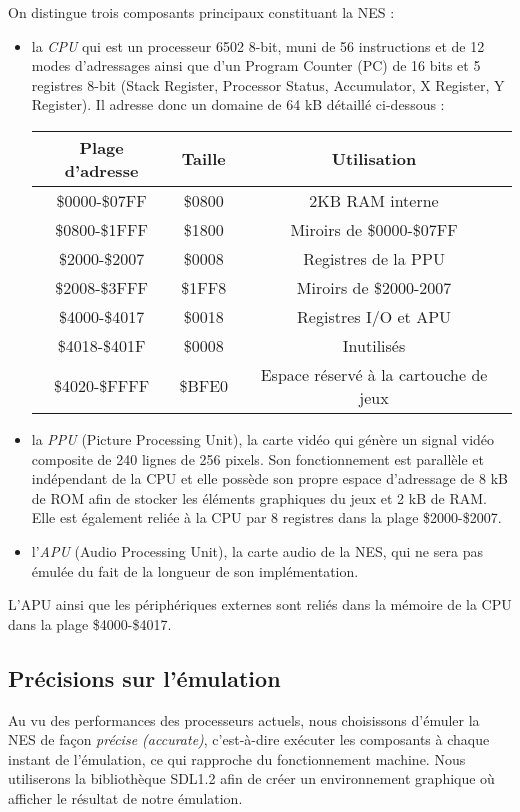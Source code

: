 On distingue trois composants principaux constituant la NES :
\begin{itemize}
\item la \emph{CPU} qui est un processeur 6502 8-bit, muni de 56 instructions et de 12 modes d'adressages ainsi que d'un Program Counter (PC) de 16 bits et 5 registres 8-bit (Stack Register, Processor Status, Accumulator, X Register, Y Register). Il adresse donc un domaine de 64 kB détaillé ci-dessous :

\begin{center}
\begin{tabular}{|c|c|c|}
  \hline
  Plage d'adresse & Taille & Utilisation \\
  \hline
  \$0000-\$07FF & \$0800 & 2KB RAM interne\\
  \hline
  \$0800-\$1FFF & \$1800 & Miroirs de \$0000-\$07FF \\
  \hline
  \$2000-\$2007 & \$0008 & Registres de la PPU \\
  \hline
  \$2008-\$3FFF & \$1FF8 & Miroirs de \$2000-2007 \\
  \hline
  \$4000-\$4017 & \$0018 & Registres I/O et APU \\
  \hline
  \$4018-\$401F & \$0008 & Inutilisés \\
  \hline
  \$4020-\$FFFF & \$BFE0 & Espace réservé à la cartouche de jeux \\
  \hline
\end{tabular}
\end{center}
\hspace{1pt}
\item la \emph{PPU} (Picture Processing Unit), la carte vidéo qui génère un signal vidéo composite de 240 lignes de 256 pixels. Son fonctionnement est parallèle et indépendant de la CPU et elle possède son propre espace d'adressage de 8 kB de ROM afin de stocker les éléments graphiques du jeux et 2 kB de RAM. Elle est également reliée à la CPU par 8 registres dans la plage \$2000-\$2007.
\item l'\emph{APU} (Audio Processing Unit), la carte audio de la NES, qui ne sera pas émulée du fait de la longueur de son implémentation.
\end{itemize}

L'APU ainsi que les périphériques externes sont reliés dans la mémoire de la CPU dans la plage \$4000-\$4017.

\subsection{Précisions sur l'émulation}
\label{subsec:precision_sur_lemulation}
Au vu des performances des processeurs actuels, nous choisissons d'émuler la NES de façon \emph{précise (accurate)}, c'est-à-dire exécuter les composants à chaque instant de l'émulation, ce qui rapproche du fonctionnement machine.
Nous utiliserons la bibliothèque SDL1.2 afin de créer un environnement graphique où afficher le résultat de notre émulation.
